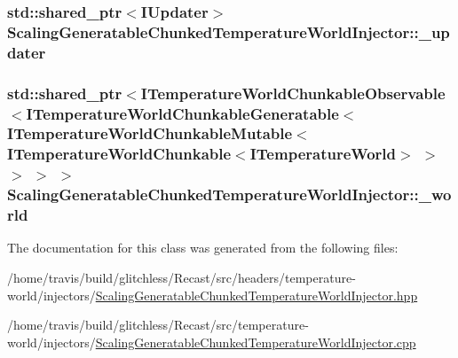 \hypertarget{class_scaling_generatable_chunked_temperature_world_injector_aa94745f5caba594ed9dcfbfc21685358}{
\subsubsection[{\-\_\-updater}]{\setlength{\rightskip}{0pt plus 5cm}std\-::shared\-\_\-ptr$<${\bf I\-Updater}$>$ Scaling\-Generatable\-Chunked\-Temperature\-World\-Injector\-::\-\_\-updater\hspace{0.3cm}{\ttfamily [protected]}}}\label{class_scaling_generatable_chunked_temperature_world_injector_aa94745f5caba594ed9dcfbfc21685358}
\hypertarget{class_scaling_generatable_chunked_temperature_world_injector_a8af169452d94765c5bdd6302f5420ebb}{
\subsubsection[{\-\_\-world}]{\setlength{\rightskip}{0pt plus 5cm}std\-::shared\-\_\-ptr$<${\bf I\-Temperature\-World\-Chunkable\-Observable}$<${\bf I\-Temperature\-World\-Chunkable\-Generatable}$<${\bf I\-Temperature\-World\-Chunkable\-Mutable}$<${\bf I\-Temperature\-World\-Chunkable}$<${\bf I\-Temperature\-World}$>$ $>$ $>$ $>$ $>$ Scaling\-Generatable\-Chunked\-Temperature\-World\-Injector\-::\-\_\-world\hspace{0.3cm}{\ttfamily [protected]}}}\label{class_scaling_generatable_chunked_temperature_world_injector_a8af169452d94765c5bdd6302f5420ebb}


The documentation for this class was generated from the following files\-:\begin{DoxyCompactItemize}
\item 
/home/travis/build/glitchless/\-Recast/src/headers/temperature-\/world/injectors/\hyperlink{_scaling_generatable_chunked_temperature_world_injector_8hpp}{Scaling\-Generatable\-Chunked\-Temperature\-World\-Injector.\-hpp}\item 
/home/travis/build/glitchless/\-Recast/src/temperature-\/world/injectors/\hyperlink{_scaling_generatable_chunked_temperature_world_injector_8cpp}{Scaling\-Generatable\-Chunked\-Temperature\-World\-Injector.\-cpp}\end{DoxyCompactItemize}
